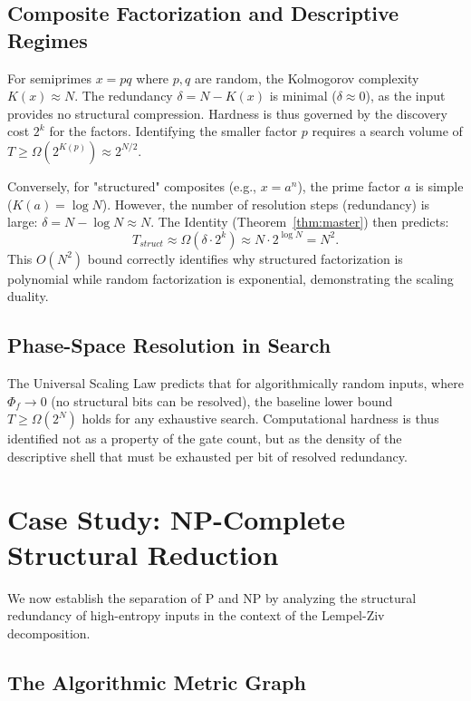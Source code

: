 \documentclass[12pt,a4paper]{article}
\theoremstyle{plain}
\theoremstyle{definition}
\begin{document}
\subsection{Composite Factorization and Descriptive Regimes}

For semiprimes $x = pq$ where $p, q$ are random, the Kolmogorov complexity $K(x) \approx N$. 
The redundancy $\delta = N - K(x)$ is minimal ($\delta \approx 0$), as the input provides 
no structural compression. Hardness is thus governed by the discovery cost $2^{k}$ for the 
factors. Identifying the smaller factor $p$ requires a search volume of $T \ge 
\Omega(2^{K(p)}) \approx 2^{N/2}$.

Conversely, for "structured" composites (e.g., $x = a^n$), the prime factor $a$ is simple 
($K(a) = \log N$). However, the number of resolution steps (redundancy) is large: 
$\delta = N - \log N \approx N$. The Identity (Theorem~\ref{thm:master}) then predicts:
\begin{equation}
    T_{struct} \approx \Omega(\delta \cdot 2^{k}) \approx N \cdot 2^{\log N} = N^2.
\end{equation}
This $O(N^2)$ bound correctly identifies why structured factorization is polynomial while random 
factorization is exponential, demonstrating the scaling duality.

\subsection{Phase-Space Resolution in Search}

The Universal Scaling Law predicts that for algorithmically random inputs, where 
$\Phi_f \to 0$ (no structural bits can be resolved), the baseline lower bound $T \ge 
\Omega(2^N)$ holds for any exhaustive search. Computational hardness is thus identified 
not as a property of the gate count, but as the density of the descriptive shell that must be 
exhausted per bit of resolved redundancy.

\section{Case Study: NP-Complete Structural Reduction} \label{sec:np}

We now establish the separation of P and NP by analyzing the structural redundancy of 
high-entropy inputs in the context of the Lempel-Ziv decomposition.

\subsection{The Algorithmic Metric Graph}
\end{document}
